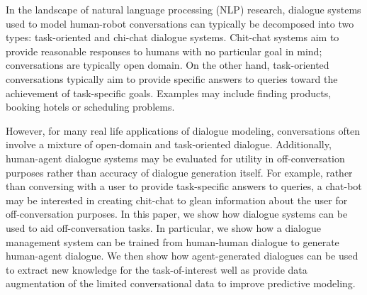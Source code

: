 In the landscape of natural language processing (NLP) research, 
dialogue systems used to model human-robot conversations can typically be decomposed into two types: 
task-oriented and chi-chat dialogue systems. 
Chit-chat systems aim to provide reasonable responses to humans with no particular goal in mind; 
conversations are typically open domain. 
On the other hand, task-oriented conversations typically aim to provide specific answers to queries toward the achievement of 
task-specific goals. Examples may include finding products, booking hotels or scheduling problems. 

However, for many real life applications of dialogue modeling, 
conversations often involve a mixture of open-domain and task-oriented dialogue. 
Additionally, human-agent dialogue systems may be evaluated for utility in off-conversation 
purposes rather than accuracy of dialogue generation itself. For example, rather than conversing 
with a user to provide task-specific answers to queries, a chat-bot may be interested in creating 
chit-chat to glean information about the user for off-conversation purposes. 
In this paper, we show how dialogue systems can be used to aid off-conversation tasks. 
In particular, we show how a dialogue management system can be trained from human-human dialogue to generate human-agent dialogue. 
We then show how agent-generated dialogues can be used to extract new knowledge for 
the task-of-interest well as provide data augmentation of the limited conversational data to improve predictive modeling.
